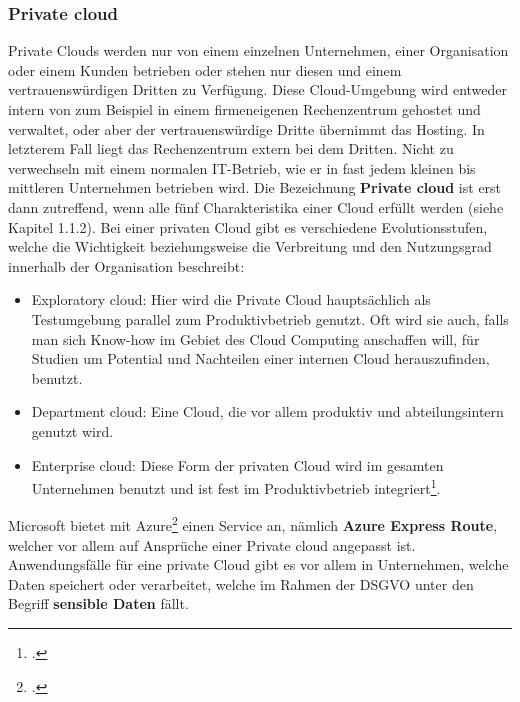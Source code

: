 \subsubsection{Private cloud}
Private Clouds werden nur von einem einzelnen Unternehmen, einer Organisation oder einem Kunden betrieben oder stehen nur diesen und einem vertrauenswürdigen Dritten zu Verfügung. Diese Cloud-Umgebung wird entweder intern von zum Beispiel in einem firmeneigenen Rechenzentrum gehostet und verwaltet, oder aber der vertrauenswürdige Dritte übernimmt das Hosting. In letzterem Fall liegt das Rechenzentrum extern bei dem Dritten. Nicht zu verwechseln mit einem normalen IT-Betrieb, wie er in fast jedem kleinen bis mittleren Unternehmen betrieben wird. Die Bezeichnung \textbf{Private cloud} ist erst dann zutreffend, wenn alle fünf Charakteristika einer Cloud erfüllt werden (siehe Kapitel 1.1.2).
Bei einer privaten Cloud gibt es verschiedene Evolutionsstufen, welche die Wichtigkeit beziehungsweise die Verbreitung und den Nutzungsgrad innerhalb der Organisation beschreibt:
\begin{itemize}
	\item Exploratory cloud: Hier wird die Private Cloud hauptsächlich als Testumgebung parallel zum Produktivbetrieb genutzt. Oft wird sie auch, falls man sich Know-how im Gebiet des Cloud Computing anschaffen will, für Studien um Potential und Nachteilen einer internen Cloud herauszufinden, benutzt.
	\item Department cloud: Eine Cloud, die vor allem produktiv und abteilungsintern genutzt wird.
	\item Enterprise cloud: Diese Form der privaten Cloud wird im gesamten Unternehmen benutzt und ist fest im Produktivbetrieb integriert\footcite{Lehrunterlagen-HTL-cloud}.
\end{itemize}

Microsoft bietet mit Azure\footcite{cloud-ms-privat} einen Service an, nämlich \textbf{Azure Express Route}, welcher vor allem auf Ansprüche einer Private cloud angepasst ist.
Anwendungsfälle für eine private Cloud gibt es vor allem in Unternehmen, welche Daten speichert oder verarbeitet, welche im Rahmen der DSGVO unter den Begriff \textbf{sensible Daten} fällt.

